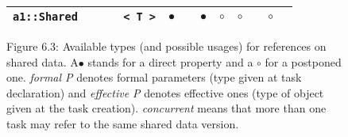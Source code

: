 \begin{figure}[htbp]
\begin{center}
\begin{tabular}{|l|c|c|c|c|c|c|c|c|}
\\\hline
\begin{minipage}[c]{44mm}
\verb!a1::Shared       < T >!
\end{minipage}
 & $\bullet$ &           & $\bullet$ & $\circ$   & $\circ$   &           & $\circ$   &
\\\hline
\end{tabular}
\end{center}
\caption{ Figure 6.3: Available types (and possible usages) for references on shared data. A$\bullet$ 
stands for a direct property and a $\circ$ for a postponed one. \textit{formal P} denotes 
formal parameters (type given at task declaration) and \textit{effective P} denotes effective ones (type of object given 
at the task creation). \textit{concurrent} means that more than one task may refer to the same shared data version.
}
\label{fig:shd_types}
\end{figure}



\newpage



